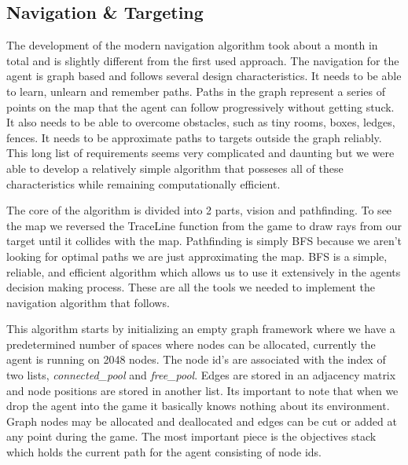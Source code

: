 \documentclass[11pt,a4paper]{article}
\begin{document}
\subsection{Navigation \& Targeting}
The development of the modern navigation algorithm took about a month in total and is slightly different from the first used approach. The navigation for the agent is graph based and follows several design characteristics. It needs to be able to learn, unlearn and remember paths. Paths in the graph represent a series of points on the map that the agent can follow progressively without getting stuck. It also needs to be able to overcome obstacles, such as tiny rooms, boxes, ledges, fences. It needs to be approximate paths to targets outside the graph reliably. This long list of requirements seems very complicated and daunting but we were able to develop a relatively simple algorithm that posseses all of these characteristics while remaining computationally efficient.

The core of the algorithm is divided into 2 parts, vision and pathfinding. To see the map we reversed the TraceLine function from the game to draw rays from our target until it collides with the map. Pathfinding is simply BFS because we aren't looking for optimal paths we are just approximating the map. BFS is a simple, reliable, and efficient algorithm which allows us to use it extensively in the agents decision making process. These are all the tools we needed to implement the navigation algorithm that follows.

This algorithm starts by initializing an empty graph framework where we have a predetermined number of spaces where nodes can be allocated, currently the agent is running on 2048 nodes. The node id's are associated with the index of two lists, \textit{connected\_pool} and \textit{free\_pool}. Edges are stored in an adjacency matrix and node positions are stored in another list. Its important to note that when we drop the agent into the game it basically knows nothing about its environment. Graph nodes may be allocated and deallocated and edges can be cut or added at any point during the game. The most important piece is the objectives stack which holds the current path for the agent consisting of node ids.
\end{document}
